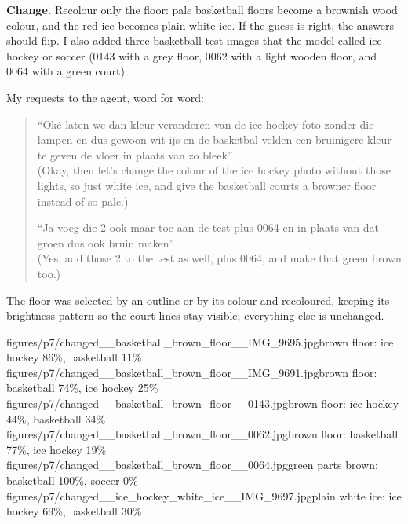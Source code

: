 \documentclass[11pt]{article}
\begin{document}
\textbf{Change.} Recolour only the floor: pale basketball floors become a
brownish wood colour, and the red ice becomes plain white ice. If the guess is
right, the answers should flip. I also added three basketball test images that
the model called ice hockey or soccer (0143 with a grey floor, 0062 with a light
wooden floor, and 0064 with a green court).

My requests to the agent, word for word:
\begin{quote}
``Oké laten we dan kleur veranderen van de ice hockey foto zonder die lampen en
dus gewoon wit ijs en de basketbal velden een bruinigere kleur te geven de vloer
in plaats van zo bleek''\\
(Okay, then let's change the colour of the ice hockey photo without those lights,
so just white ice, and give the basketball courts a browner floor instead of so
pale.)

``Ja voeg die 2 ook maar toe aan de test plus 0064 en in plaats van dat groen dus
ook bruin maken''\\
(Yes, add those 2 to the test as well, plus 0064, and make that green brown too.)
\end{quote}

The floor was selected by an outline or by its colour and recoloured, keeping its
brightness pattern so the court lines stay visible; everything else is unchanged.

           {figures/p7/changed__basketball_brown_floor__IMG_9695.jpg}{brown floor: ice hockey 86\%, basketball 11\%}
           {figures/p7/changed__basketball_brown_floor__IMG_9691.jpg}{brown floor: basketball 74\%, ice hockey 25\%}
           {figures/p7/changed__basketball_brown_floor__0143.jpg}{brown floor: ice hockey 44\%, basketball 34\%}
           {figures/p7/changed__basketball_brown_floor__0062.jpg}{brown floor: basketball 77\%, ice hockey 19\%}
           {figures/p7/changed__basketball_brown_floor__0064.jpg}{green parts brown: basketball 100\%, soccer 0\%}
           {figures/p7/changed__ice_hockey_white_ice__IMG_9697.jpg}{plain white ice: ice hockey 69\%, basketball 30\%}
\end{document}
